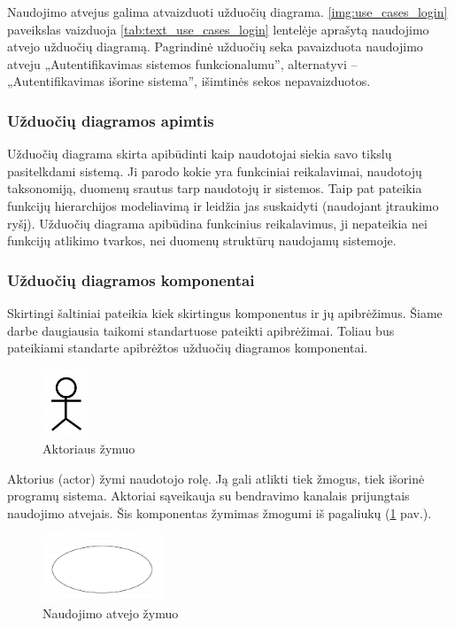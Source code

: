 Naudojimo atvejus galima atvaizduoti užduočių diagrama. \ref{img:use_cases_login} paveikslas vaizduoja \ref{tab:text_use_cases_login} lentelėje aprašytą naudojimo atvejo užduočių diagramą. Pagrindinė užduočių seka pavaizduota naudojimo atveju „Autentifikavimas sistemos funkcionalumu”,  alternatyvi – „Autentifikavimas išorine sistema”, išimtinės sekos nepavaizduotos.


\subsubsection{Užduočių diagramos apimtis}
Užduočių diagrama skirta apibūdinti kaip naudotojai siekia savo tikslų pasitelkdami sistemą. Ji parodo kokie yra funkciniai reikalavimai, naudotojų taksonomiją, duomenų srautus tarp naudotojų ir sistemos. Taip pat pateikia funkcijų hierarchijos modeliavimą ir leidžia jas suskaidyti (naudojant įtraukimo ryšį). Užduočių diagrama apibūdina funkcinius reikalavimus, ji nepateikia nei funkcijų atlikimo tvarkos, nei duomenų struktūrų naudojamų sistemoje.

\subsubsection{Užduočių diagramos komponentai} \label{section:use_cases_components}
Skirtingi šaltiniai pateikia kiek skirtingus komponentus ir jų apibrėžimus. Šiame darbe daugiausia taikomi \OMG{} standartuose pateikti apibrėžimai. Toliau bus pateikiami \UML{} standarte apibrėžtos užduočių diagramos komponentai.

\begin{figure}[H]
	\centering
	\includegraphics[height=2cm]{img/use_case_components/actor}
	\caption{Aktoriaus žymuo}
	\label{img:use_case_components_actor}
\end{figure}

Aktorius (actor) žymi naudotojo rolę. Ją gali atlikti tiek žmogus, tiek išorinė programų sistema. Aktoriai sąveikauja su bendravimo kanalais prijungtais naudojimo atvejais. Šis komponentas žymimas žmogumi iš pagaliukų (\ref{img:use_case_components_actor} pav.).

\begin{figure}[H]
	\centering
	\includegraphics[height=2cm]{img/use_case_components/use_case}
	\caption{Naudojimo atvejo žymuo}
	\label{img:use_case_components_use_case}
\end{figure}

